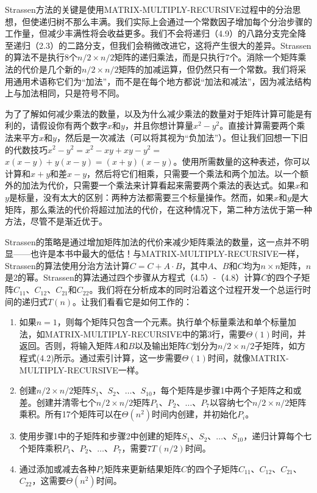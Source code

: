 \documentclass[lang=cn,newtx,10pt,scheme=chinese]{elegantbook}
\begin{document}
Strassen方法的关键是使用MATRIX-MULTIPLY-RECURSIVE过程中的分治思想，但使递归树不那么丰满。我们实际上会通过一个常数因子增加每个分治步骤的工作量，但减少丰满性将会收益更多。我们不会将递归（4.9）的八路分支完全降至递归（2.3）的二路分支，但我们会稍微改进它，这将产生很大的差异。Strassen的算法不是执行$8$个$n / 2 \times n / 2$矩阵的递归乘法，而是只执行$7$个。消除一个矩阵乘法的代价是几个新的$n / 2 \times n / 2$矩阵的加减运算，但仍然只有一个常数。我们将采用通用术语称它们为``加法''，而不是在每个地方都说``加法和减法''，因为减法结构上与加法相同，只是符号不同。

为了了解如何减少乘法的数量，以及为什么减少乘法的数量对于矩阵计算可能是有利的，请假设你有两个数字$x$和$y$，并且你想计算量$x^2-y^2$。直接计算需要两个乘法来平方$x$和$y$，然后是一次减法（可以将其视为“负加法”）。但让我们回想一下旧的代数技巧$x^2-y^2=x^2-x y+x y-y^2=$ $x(x-y)+y(x-y)=(x+y)(x-y)$。使用所需数量的这种表述，你可以计算和$x+y$和差$x-y$，然后将它们相乘，只需要一个乘法和两个加法。以一个额外的加法为代价，只需要一个乘法来计算看起来需要两个乘法的表达式。如果$x$和$y$是标量，没有太大的区别：两种方法都需要三个标量操作。然而，如果$x$和$y$是大矩阵，那么乘法的代价将超过加法的代价，在这种情况下，第二种方法优于第一种方法，尽管不是渐近优于。

Strassen的策略是通过增加矩阵加法的代价来减少矩阵乘法的数量，这一点并不明显——也许是本书中最大的低估！与MATRIX-MULTIPLY-RECURSIVE一样，Strassen的算法使用分治方法计算$C=C+A \cdot B$，其中$A、B$和$C$均为$n \times n$矩阵，$n$是2的幂。Strassen的算法通过四个步骤从方程式（4.5）-（4.8）计算$C$的四个子矩阵$C_{11}$、$C_{12}$、$C_{21}$和$C_{22}$。我们将在分析成本的同时沿着这个过程开发一个总运行时间的递归式$T(n)$。让我们看看它是如何工作的：

\begin{enumerate}
\item 如果$n=1$，则每个矩阵只包含一个元素。执行单个标量乘法和单个标量加法，如MATRIX-MULTIPLY-RECURSIVE中的第3行，需要$\Theta(1)$时间，并返回。否则，将输入矩阵$A$和$B$以及输出矩阵$C$划分为$n/2\times n/2$子矩阵，如方程式(4.2)所示。通过索引计算，这一步需要$\Theta(1)$时间，就像MATRIX-MULTIPLY-RECURSIVE一样。
\item 创建$n/2\times n/2$矩阵$S_1$、$S_2$、$\ldots$、$S_{10}$，每个矩阵是步骤1中两个子矩阵之和或差。创建并清零七个$n/2\times n/2$矩阵$P_1、P_2、\ldots、P_7$以容纳七个$n/2\times n/2$矩阵乘积。所有17个矩阵可以在$\Theta\left(n^2\right)$时间内创建，并初始化$P_i$。
\item 使用步骤1中的子矩阵和步骤2中创建的矩阵$S_1$、$S_2$、$\ldots$、$S_{10}$，递归计算每个七个矩阵乘积$P_1$、$P_2$、$\ldots$、$P_7$，需要$7T(n/2)$时间。
\item 通过添加或减去各种$P_i$矩阵来更新结果矩阵$C$的四个子矩阵$C_{11}$、$C_{12}$、$C_{21}$、$C_{22}$，这需要$\Theta\left(n^2\right)$时间。
\end{enumerate}
\end{document}
